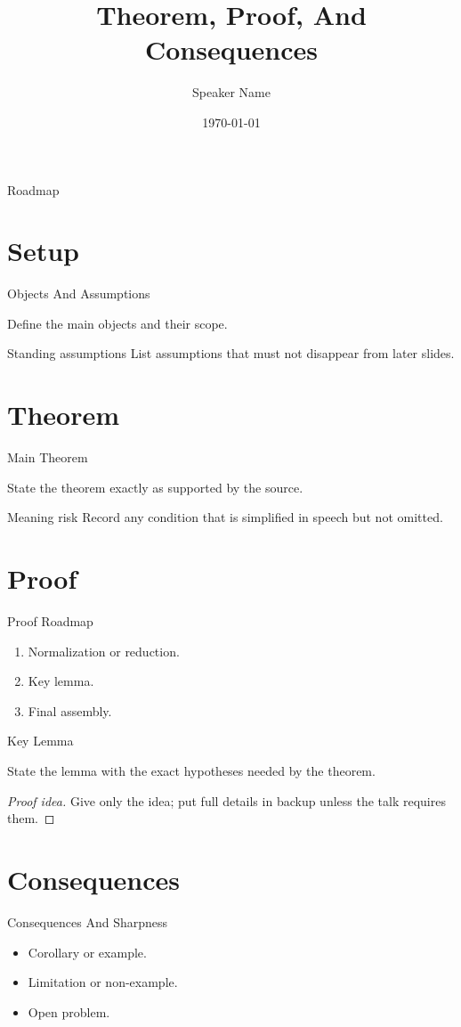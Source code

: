\documentclass[10pt,aspectratio=169]{beamer}
\title{Theorem, Proof, And Consequences}
\author{Speaker Name}
\date{\today}
\begin{document}
\begin{frame}\titlepage\end{frame}
\begin{frame}{Roadmap}\tableofcontents\end{frame}

\section{Setup}
\begin{frame}{Objects And Assumptions}
  \begin{definition}
    Define the main objects and their scope.
  \end{definition}
  \begin{block}{Standing assumptions}
    List assumptions that must not disappear from later slides.
  \end{block}
\end{frame}

\section{Theorem}
\begin{frame}{Main Theorem}
  \begin{theorem}
    State the theorem exactly as supported by the source.
  \end{theorem}
  \begin{alertblock}{Meaning risk}
    Record any condition that is simplified in speech but not omitted.
  \end{alertblock}
\end{frame}

\section{Proof}
\begin{frame}{Proof Roadmap}
  \begin{enumerate}
    \item Normalization or reduction.
    \item Key lemma.
    \item Final assembly.
  \end{enumerate}
\end{frame}

\begin{frame}{Key Lemma}
  \begin{lemma}
    State the lemma with the exact hypotheses needed by the theorem.
  \end{lemma}
  \begin{proof}[Proof idea]
    Give only the idea; put full details in backup unless the talk requires them.
  \end{proof}
\end{frame}

\section{Consequences}
\begin{frame}{Consequences And Sharpness}
  \begin{itemize}
    \item Corollary or example.
    \item Limitation or non-example.
    \item Open problem.
  \end{itemize}
\end{frame}
\end{document}
